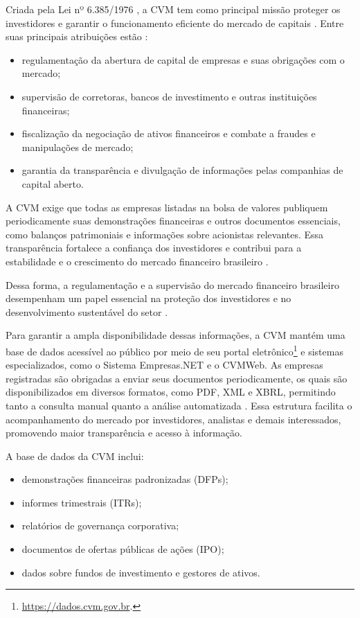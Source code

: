 \documentclass[recuosum=1.5cm]{iftex2024}
\begin{document}
Criada pela Lei nº 6.385/1976 \cite{brasil:1976:lei6385}, a CVM tem como principal missão proteger os investidores e garantir o funcionamento eficiente do mercado de capitais \cite{cvm:2009:informacao}. Entre suas principais atribuições estão \cite{cvm:2009:informacao, roberto:2023:papel}:

\begin{itemize}
	\item regulamentação da abertura de capital de empresas e suas obrigações com o mercado;
	\item supervisão de corretoras, bancos de investimento e outras instituições financeiras;
	\item fiscalização da negociação de ativos financeiros e combate a fraudes e manipulações de mercado;
	\item garantia da transparência e divulgação de informações pelas companhias de capital aberto.
\end{itemize}

A CVM exige que todas as empresas listadas na bolsa de valores publiquem periodicamente suas demonstrações financeiras e outros documentos essenciais, como balanços patrimoniais e informações sobre acionistas relevantes. Essa transparência fortalece a confiança dos investidores e contribui para a estabilidade e o crescimento do mercado financeiro brasileiro \cite{fgv:2024:transformacao}.

Dessa forma, a regulamentação e a supervisão do mercado financeiro brasileiro desempenham um papel essencial na proteção dos investidores e no desenvolvimento sustentável do setor \cite{figueiredo:2023:capacidade}.

Para garantir a ampla disponibilidade dessas informações, a CVM mantém uma base de dados acessível ao público por meio de seu portal eletrônico\footnote{\url{https://dados.cvm.gov.br}.}  e sistemas especializados, como o Sistema Empresas.NET e o CVMWeb. As empresas registradas são obrigadas a enviar seus documentos periodicamente, os quais são disponibilizados em diversos formatos, como PDF, XML e XBRL, permitindo tanto a consulta manual quanto a análise automatizada \cite{cvm:2009:informacao}. Essa estrutura facilita o acompanhamento do mercado por investidores, analistas e demais interessados, promovendo maior transparência e acesso à informação.

A base de dados da CVM inclui:

\begin{itemize}
	\item demonstrações financeiras padronizadas (DFPs);
	\item informes trimestrais (ITRs);
	\item relatórios de governança corporativa;
	\item documentos de ofertas públicas de ações (IPO);
	\item dados sobre fundos de investimento e gestores de ativos.
\end{itemize}
\end{document}
